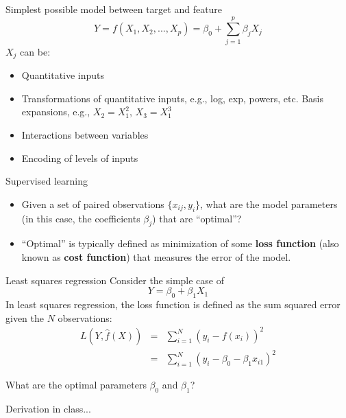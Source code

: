 \documentclass{beamer}
\begin{document}
\begin{frame}{Simplest possible model between target and feature}
    \begin{equation*}
        Y=f(X_1,X_2,...,X_p)= \beta_0 + \sum_{j=1}^p \beta_j X_j
    \end{equation*}
    $X_j$ can be:
    \begin{itemize}
        \item Quantitative inputs
        \item Transformations of quantitative inputs, e.g., log, exp, powers, etc.
        Basis expansions, e.g., $X_2 = X_1^2$, $X_3 = X_1^3$
        \item Interactions between variables
        \item Encoding of levels of inputs
    \end{itemize}
\end{frame}


\begin{frame}{Supervised learning}
    \begin{itemize}
        \item Given a set of paired observations $\{x_{ij}, y_i\}$, what are the model parameters (in this case, the coefficients $\beta_j$) that are ``optimal''?
        \item ``Optimal'' is typically defined as minimization of some \textbf{loss function} (also known as \textbf{cost function}) that measures the error of the model.
    \end{itemize}
\end{frame}


\begin{frame}{Least squares regression}
    Consider the simple case of
    \begin{equation*}
        Y = \beta_0 + \beta_1 X_1
    \end{equation*}
    In least squares regression, the loss function is defined as the sum squared error given the $N$ observations:
    \begin{eqnarray*}
        L(Y, \hat{f}(X)) & = & \sum_{i=1}^N (y_i - f(x_i))^2 \\
        & = & \sum_{i=1}^N (y_i - \beta_0 - \beta_1 x_{i1})^2
    \end{eqnarray*}
    \end{frame}

    \begin{frame}{What are the optimal parameters $\beta_0$ and $\beta_1$?}
       \Huge{\centerline{Derivation in class...}}
    \end{frame}
\end{document}
